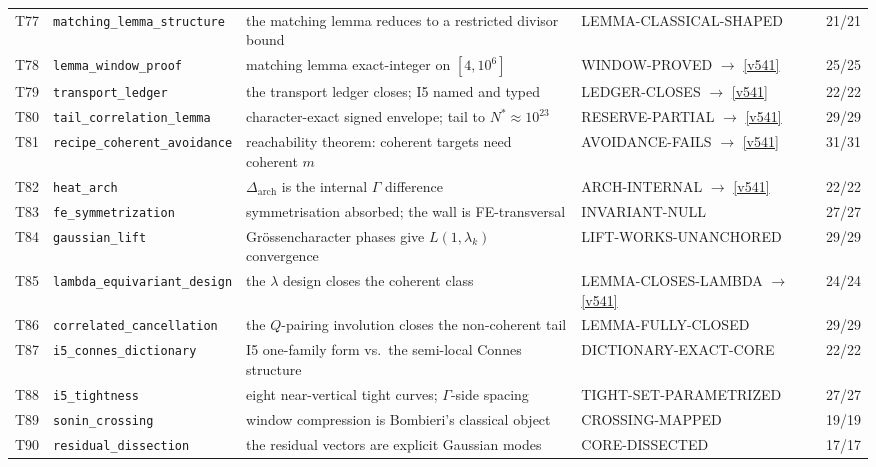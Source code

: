 \documentclass[11pt,a4paper]{article}
\newcommand{\Darch}{\Delta_{\mathrm{arch}}}
\begin{document}
{\begin{xltabular}{\linewidth}{@{}p{0.95cm} >{\raggedright\arraybackslash}p{3.1cm} Y >{\raggedright\scriptsize\arraybackslash}p{3.35cm} p{1.15cm}@{}}
T77 & \texttt{\scriptsize matching\_\allowbreak lemma\_\allowbreak structure} & the matching lemma reduces to a restricted divisor bound & LEMMA-CLASSICAL-SHAPED & 21/21\\
T78 & \texttt{\scriptsize lemma\_\allowbreak window\_\allowbreak proof} & matching lemma exact-integer on $[4,10^6]$ & WINDOW-PROVED $\to$ \vref{v541} & 25/25\\
T79 & \texttt{\scriptsize transport\_\allowbreak ledger} & the transport ledger closes; I5 named and typed & LEDGER-CLOSES $\to$ \vref{v541} & 22/22\\
T80 & \texttt{\scriptsize tail\_\allowbreak correlation\_\allowbreak lemma} & character-exact signed envelope; tail to $N^*\!\approx\!10^{23}$ & RESERVE-PARTIAL $\to$ \vref{v541} & 29/29\\
T81 & \texttt{\scriptsize recipe\_\allowbreak coherent\_\allowbreak avoidance} & reachability theorem: coherent targets need coherent $m$ & AVOIDANCE-FAILS $\to$ \vref{v541} & 31/31\\
T82 & \texttt{\scriptsize heat\_\allowbreak arch} & $\Darch$ is the internal $\Gamma$ difference & ARCH-INTERNAL $\to$ \vref{v541} & 22/22\\
T83 & \texttt{\scriptsize fe\_\allowbreak symmetrization} & symmetrisation absorbed; the wall is FE-transversal & INVARIANT-NULL & 27/27\\
T84 & \texttt{\scriptsize gaussian\_\allowbreak lift} & Gr\"ossencharacter phases give $L(1,\lambda_k)$ convergence & LIFT-WORKS-UNANCHORED & 29/29\\
T85 & \texttt{\scriptsize lambda\_\allowbreak equivariant\_\allowbreak design} & the $\lambda$ design closes the coherent class & LEMMA-CLOSES-LAMBDA $\to$ \vref{v541} & 24/24\\
T86 & \texttt{\scriptsize correlated\_\allowbreak cancellation} & the $Q$-pairing involution closes the non-coherent tail & LEMMA-FULLY-CLOSED & 29/29\\
T87 & \texttt{\scriptsize i5\_\allowbreak connes\_\allowbreak dictionary} & I5 one-family form vs.\ the semi-local Connes structure & DICTIONARY-EXACT-CORE & 22/22\\
T88 & \texttt{\scriptsize i5\_\allowbreak tightness} & eight near-vertical tight curves; $\Gamma$-side spacing & TIGHT-SET-PARAMETRIZED & 27/27\\
T89 & \texttt{\scriptsize sonin\_\allowbreak crossing} & window compression is Bombieri's classical object & CROSSING-MAPPED & 19/19\\
T90 & \texttt{\scriptsize residual\_\allowbreak dissection} & the residual vectors are explicit Gaussian modes & CORE-DISSECTED & 17/17\\

\end{xltabular}}
\end{document}
